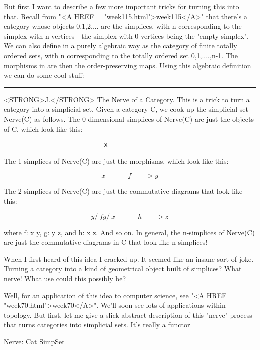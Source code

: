 But first I want to describe a few more important tricks for turning
this into that.  Recall from "<A HREF =
"week115.html">week115</A>" that there's a category \Delta  whose
objects 0,1,2,... are the simplices, with n corresponding to the
simplex with n vertices - the simplex with 0 vertices being the
"empty simplex".  We can also define \Delta  in a purely
algebraic way as the category of finite totally ordered sets, with n
corresponding to the totally ordered set {0,1,....,n-1}.  The
morphisms in \Delta  are then the order-preserving maps.  Using this
algebraic definition we can do some cool stuff:

\par\noindent\rule{\textwidth}{0.4pt}
<STRONG>J.</STRONG>  The Nerve of a Category.  This is a trick to turn a category into a
simplicial set.  Given a category C, we cook up the simplicial set
Nerve(C) as follows.  The 0-dimensional simplices of Nerve(C) are just
the objects of C, which look like this:

\begin{verbatim}
                            x
\end{verbatim}
    
The 1-simplices of Nerve(C) are just the morphisms, which look like
this:

$$
                        x---f-->y
$$
    
The 2-simplices of Nerve(C) are just the commutative diagrams that
look like this:

$$
                            y
                           / \                 
                          f   g
                         /     \
                        x---h-->z 
$$
    
where f: x \to  y, g: y \to  z, and h: x \to  z.  And so on.  In general,
the n-simplices of Nerve(C) are just the commutative diagrams in 
C that look like n-simplices!  

When I first heard of this idea I cracked up.  It seemed like an insane
sort of joke.  Turning a category into a kind of geometrical object
built of simplices?  What nerve!  What use could this possibly be?  

Well, for an application of this idea to computer science, see "<A HREF = "week70.html">week70</A>".
We'll soon see lots of applications within topology.  But first, let me
give a slick abstract description of this "nerve" process that turns
categories into simplicial sets.  It's really a functor

Nerve: Cat \to  SimpSet

